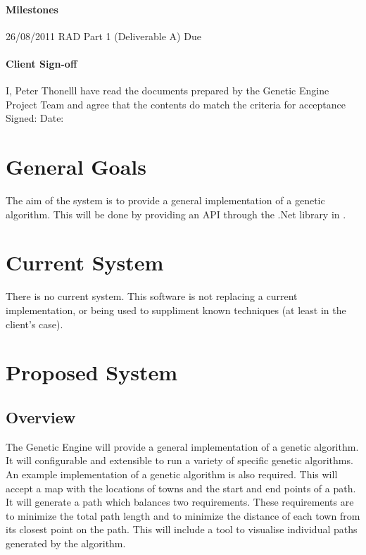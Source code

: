 \paragraph*{Milestones}
26/08/2011 RAD Part 1 (Deliverable A) Due

\paragraph*{Client Sign-off}
I, Peter Thonelll have read the documents prepared by the Genetic Engine Project Team and agree that the contents do match the criteria for acceptance
Signed: 
Date: 

\clearpage


%
%
\section{General Goals}
The aim of the system is to provide a general implementation of a genetic algorithm. 
This will be done by providing an API through the .Net library in \csharp. 


%
%
\section{Current System}
There is no current system. %
This software is not replacing a current implementation, or being used to suppliment known techniques (at least in the client's case).


%
%

\section{Proposed System}
\subsection{Overview}
The Genetic Engine will provide a general implementation of a genetic algorithm. It will configurable and extensible to run a variety of specific genetic algorithms.
An example implementation of a genetic algorithm is also required. This will accept a map with the locations of towns and the start and end points of a path. It will generate a path which balances two requirements. These requirements are to minimize the total path length and to minimize the distance of each town from its closest point on the path. This will include a tool to visualise individual paths generated by the algorithm.

